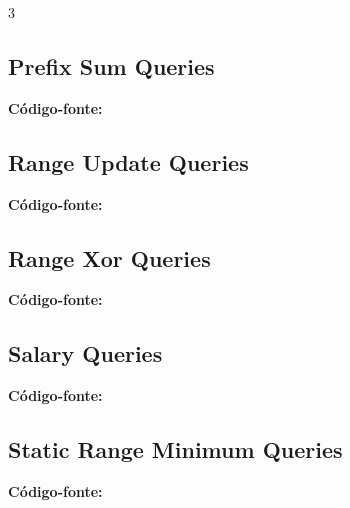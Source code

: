 \documentclass[8pt]{extarticle}
\begin{document}
\begin{multicols*}{3}
\subsection{Prefix Sum Queries}
\begin{caixaenunciado}

\end{caixaenunciado}
\vspace{0.3cm}
\noindent\textbf{Código-fonte:}


\subsection{Range Update Queries}
\begin{caixaenunciado}

\end{caixaenunciado}
\vspace{0.3cm}
\noindent\textbf{Código-fonte:}


\subsection{Range Xor Queries}
\begin{caixaenunciado}

\end{caixaenunciado}
\vspace{0.3cm}
\noindent\textbf{Código-fonte:}


\subsection{Salary Queries}
\begin{caixaenunciado}

\end{caixaenunciado}
\vspace{0.3cm}
\noindent\textbf{Código-fonte:}


\subsection{Static Range Minimum Queries}
\begin{caixaenunciado}

\end{caixaenunciado}
\vspace{0.3cm}
\noindent\textbf{Código-fonte:}



\end{multicols*}
\end{document}
